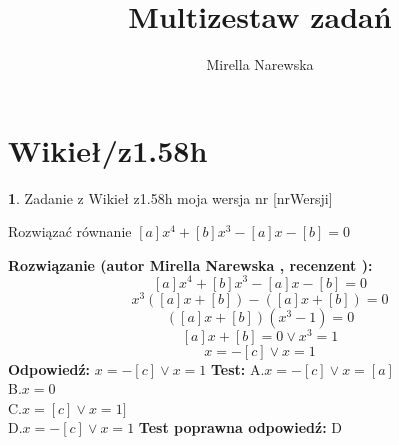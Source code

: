 \documentclass[12pt, a4paper]{article}
\title{Multizestaw zadań}
\author{Mirella Narewska}
\date{}
\theoremstyle{definition} %
\newtheorem{zad}{}
\newcommand{\kategoria}[1]{\section{#1}} %
\newcommand{\zadStart}[1]{\begin{zad}#1\newline} %
\newcommand{\zadStop}{\end{zad}}   %
\newcommand{\rozwStart}[2]{\noindent \textbf{Rozwiązanie (autor #1 , recenzent #2): }\newline} %
\newcommand{\rozwStop}{\newline}                                            %
\newcommand{\odpStart}{\noindent \textbf{Odpowiedź:}\newline}    %
\newcommand{\odpStop}{\newline}                                             %
\newcommand{\testStart}{\noindent \textbf{Test:}\newline} %
\newcommand{\testStop}{\newline} %
\newcommand{\kluczStart}{\noindent \textbf{Test poprawna odpowiedź:}\newline} %
\newcommand{\kluczStop}{\newline} %
\begin{document}
\maketitle


\kategoria{Wikieł/z1.58h}
\zadStart{Zadanie z Wikieł z1.58h  moja wersja nr [nrWersji]}

Rozwiązać równanie $[a]x^4+[b]x^3-[a]x-[b]=0$
\zadStop
\rozwStart{Mirella Narewska}{}
$$[a]x^4+[b]x^3-[a]x-[b]=0$$
$$x^3([a]x+[b])-([a]x+[b])=0$$
$$([a]x+[b])(x^3-1)=0$$
$$[a]x+[b]=0 \vee x^3=1$$
$$x=-[c] \vee x=1$$
\rozwStop
\odpStart
$x=-[c] \vee x=1$
\odpStop
\testStart
A.$x=-[c] \vee x=[a]$
\\
B.$x=0$
\\
C.$x=[c] \vee x=1]$
\\
D.$x=-[c] \vee x=1$
\testStop
\kluczStart
D
\kluczStop
\end{document}
